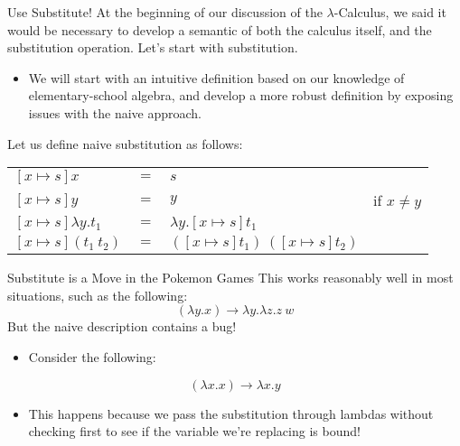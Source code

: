 \documentclass[11pt]{beamer}
\begin{document}
\begin{frame}[fragile=singleslide]{Use Substitute!}
At the beginning of our discussion of the $\lambda$-Calculus, we said it would be necessary to develop a semantic of both the calculus itself, and the substitution operation.  Let's start with substitution.  
\begin{itemize}
\item We will start with an intuitive definition based on our knowledge of elementary-school algebra, and develop a more robust definition by exposing issues with the naive approach.  
\end{itemize}
Let us define naive substitution as follows: \\
\vspace{0.4em}
\begin{tabular}{l l l l}
$[x \mapsto s]x$ & $=$ & $s$ & \\
$[x \mapsto s]y$ & $=$ & $y$ & if $x \neq y$ \\
$[x \mapsto s]\lambda y. t_1$ & $=$ & $\lambda y.[x \mapsto s]t_1$ & \\ 
$[x \mapsto s](t_1\:t_2)$ & $=$ & $([x \mapsto s]t_1)\:([x \mapsto s]t_2)$ & \\ 
\end{tabular}
\end{frame}

\begin{frame}[fragile=singleslide]{Substitute is a Move in the Pokemon Games}
This works reasonably well in most situations, such as the following:
\begin{equation}
[x \mapsto (\lambda z.z\:w)](\lambda y.x) \rightarrow \lambda y. \lambda z. z\:w
\end{equation}
But the naive description contains a bug!  
\begin{itemize}
\item Consider the following:
\end{itemize}
\begin{equation}
[x \mapsto y](\lambda x. x) \rightarrow \lambda x. y
\end{equation}
\begin{itemize}
\item This happens because we pass the substitution through lambdas without checking first to see if the variable we're replacing is bound!
\end{itemize}
\end{frame}
\end{document}
